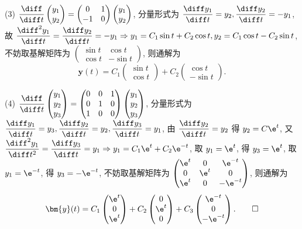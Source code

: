 \begin{solve}
  (3) $\displaystyle\frac{\diff}{\diff t}\begin{pmatrix}y_1\\y_2\end{pmatrix}=\begin{pmatrix}0&1\\-1&0\end{pmatrix}\begin{pmatrix}y_1\\y_2\end{pmatrix}$, 
  分量形式为 $\displaystyle\frac{\diff y_1}{\diff t}=y_2,\frac{\diff y_2}{\diff t}=-y_1$, 
  故 $\displaystyle\frac{\diff^2y_1}{\diff t}=\frac{\diff y_2}{\diff t}=-y_1\Rightarrow y_1=C_1\sin t+C_2\cos t,y_2=C_1\cos t-C_2\sin t$, 
  不妨取基解矩阵为 $\begin{pmatrix}\sin t&\cos t\\\cos t&-\sin t\end{pmatrix}$, 则通解为
  \[\bm{y}(t)=C_1\begin{pmatrix}\sin t\\\cos t\end{pmatrix}+C_2\begin{pmatrix}\cos t\\-\sin t\end{pmatrix}.\]

  (4) $\displaystyle\frac{\diff}{\diff t}\begin{pmatrix}y_1\\y_2\\y_3\end{pmatrix}=\begin{pmatrix}0&0&1\\0&1&0\\1&0&0\end{pmatrix}\begin{pmatrix}y_1\\y_2\\y_3\end{pmatrix}$, 
  分量形式为 $\displaystyle\frac{\diff y_1}{\diff t}=y_3,\frac{\diff y_2}{\diff t}=y_2,\frac{\diff y_3}{\diff t}=y_1$, 
  由 $\displaystyle\frac{\diff y_2}{\diff t}=y_2$
  得 $y_2=C\e^t$, 又$\displaystyle\frac{\diff^2y_1}{\diff t^2}=\frac{\diff y_3}{\diff t}=y_1\Rightarrow y_1=C_1\e^t+C_2\e^{-t}$, 
  取 $y_1=\e^t$, 得 $y_3=\e^t$, 取 $y_1=\e^{-t}$, 得 $y_3=-\e^{-t}$, 
  不妨取基解矩阵为 $\begin{pmatrix}\e^t&0&\e^{-t}\\0&\e^t&0\\\e^t&0&-\e^{-t}\end{pmatrix}$, 则通解为
  \[\bm{y}(t)=C_1\begin{pmatrix}\e^t\\0\\\e^t\end{pmatrix}+C_2\begin{pmatrix}0\\\e^t\\0\end{pmatrix}+C_3\begin{pmatrix}\e^{-t}\\0\\-\e^{-t}\end{pmatrix}.\qedhere\]
\end{solve}
